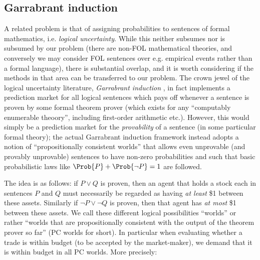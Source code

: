 \begin{subappendices}

\section{Garrabrant induction}
\label{nonvf:app:garrabrant}

A related problem is that of assigning probabilities to sentences of formal mathematics, i.e. \emph{logical uncertainty}. While this neither subsumes nor is subsumed by our problem (there are non-FOL mathematical theories, and conversely we may consider FOL sentences over e.g. empirical events rather than a formal language), there is substantial overlap, and it is worth considering if the methods in that area can be transferred to our problem. The crown jewel of the logical uncertainty literature, \emph{Garrabrant induction} \citep{garrabrantLogicalInduction2016}, in fact implements a prediction market for all logical sentences which pays off whenever a sentence is proven by some formal theorem prover (which exists for any ``computably enumerable theoory'', including first-order arithmetic etc.). However, this would simply be a prediction market for the \emph{provability} of a sentence (in some particular formal theory); the actual Garrabrant induction framework instead adopts a notion of ``propositionally consistent worlds'' that allows even unprovable (and provably unprovable) sentences to have non-zero probabilities and such that basic probabilistic laws like $\Prob{P}+\Prob{\lnot P}=1$ are followed.

The idea is as follows: if $P\lor Q$ is proven, then an agent that holds a stock each in sentences $P$ and $Q$ must necessarily be regarded as having \emph{at least} \$1 between these assets. Similarly if $\lnot P\lor\lnot Q$ is proven, then that agent has \emph{at most} \$1 between these assets. We call these different logical possibilities ``worlds'' or rather ``worlds that are propositionally consistent with the output of the theorem prover so far'' (PC worlds for short). In particular when evaluating whether a trade is within budget (to be accepted by the market-maker), we demand that it is within budget in all PC worlds. More precisely:


\end{subappendices}
